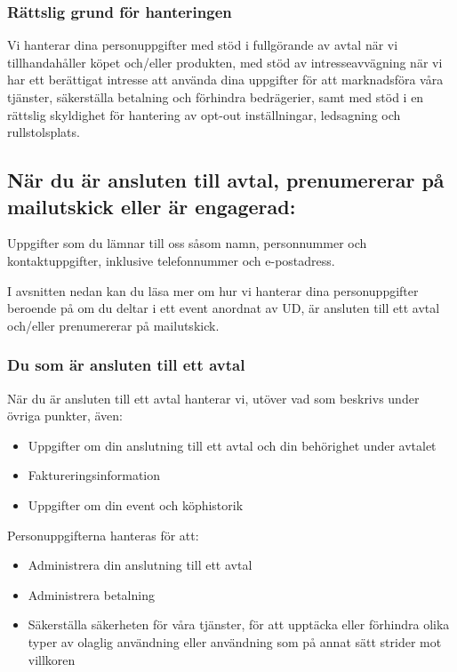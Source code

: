 \documentclass[a4paper]{article}
\begin{document}
\subsubsection{Rättslig grund för hanteringen}
Vi hanterar dina personuppgifter med stöd i fullgörande av avtal när vi tillhandahåller
köpet och/eller produkten, med stöd av intresseavvägning när vi har ett berättigat
intresse att använda dina uppgifter för att marknadsföra våra tjänster,
säkerställa betalning och förhindra bedrägerier, samt med stöd i en rättslig skyldighet
för hantering av opt-out inställningar, ledsagning och rullstolsplats.




\subsection{När du är ansluten till avtal, prenumererar på mailutskick eller är engagerad:}
Uppgifter som du lämnar till oss såsom namn, personnummer och kontaktuppgifter, inklusive telefonnummer och e-postadress.



I avsnitten nedan kan du läsa mer om hur vi hanterar dina personuppgifter beroende på
om du deltar i ett event anordnat av UD, är ansluten till ett avtal och/eller prenumererar på mailutskick.

\subsubsection{Du som är ansluten till ett avtal}
När du är ansluten till ett avtal hanterar vi, utöver vad som beskrivs under
övriga punkter, även:
\begin{itemize}
    \item Uppgifter om din anslutning till ett avtal och din behörighet under avtalet
    \item Faktureringsinformation
    \item Uppgifter om din event och köphistorik
\end{itemize}

\noindent{}Personuppgifterna hanteras för att:
\begin{itemize}
    \item Administrera din anslutning till ett avtal
    \item Administrera betalning
    \item Säkerställa säkerheten för våra tjänster, för att upptäcka eller förhindra olika typer av olaglig användning eller användning som på annat sätt strider mot villkoren
\end{itemize}
\end{document}
